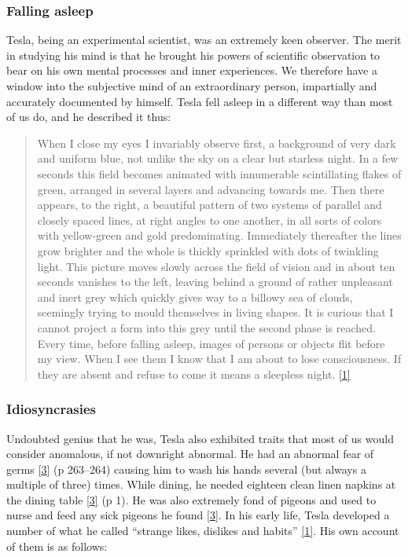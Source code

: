 \documentclass[
  12pt,
  british,
  a4paper,
  rgb,
  dvipsnames,
  svgnames,
  hyphens]{article}
\begin{document}
\hypertarget{falling-asleep}{%
\subsubsection{Falling asleep}\label{falling-asleep}}

Tesla, being an experimental scientist, was an extremely keen observer.
The merit in studying his mind is that he brought his powers of
scientific observation to bear on his own mental processes and inner
experiences. We therefore have a window into the subjective mind of an
extraordinary person, impartially and accurately documented by himself.
Tesla fell asleep in a different way than most of us do, and he
described it thus:

\begin{quote}
When I close my eyes I invariably observe first, a background of very
dark and uniform blue, not unlike the sky on a clear but starless night.
In a few seconds this field becomes animated with innumerable
scintillating flakes of green, arranged in several layers and advancing
towards me. Then there appears, to the right, a beautiful pattern of two
systems of parallel and closely spaced lines, at right angles to one
another, in all sorts of colors with yellow-green and gold
predominating. Immediately thereafter the lines grow brighter and the
whole is thickly sprinkled with dots of twinkling light. This picture
moves slowly across the field of vision and in about ten seconds
vanishes to the left, leaving behind a ground of rather unpleasant and
inert grey which quickly gives way to a billowy sea of clouds, seemingly
trying to mould themselves in living shapes. It is curious that I cannot
project a form into this grey until the second phase is reached. Every
time, before falling asleep, images of persons or objects flit before my
view. When I see them I know that I am about to lose consciousness. If
they are absent and refuse to come it means a sleepless night.
\protect\hyperlink{ref-john83}{{[}1{]}}
\end{quote}

\hypertarget{idiosyncrasies}{%
\subsubsection{Idiosyncrasies}\label{idiosyncrasies}}

Undoubted genius that he was, Tesla also exhibited traits that most of
us would consider anomalous, if not downright abnormal. He had an
abnormal fear of germs \protect\hyperlink{ref-cheney81}{{[}3{]}} (p
263--264) causing him to wash his hands several (but always a multiple
of three) times. While dining, he needed eighteen clean linen napkins at
the dining table \protect\hyperlink{ref-cheney81}{{[}3{]}} (p 1). He was
also extremely fond of pigeons and used to nurse and feed any sick
pigeons he found \protect\hyperlink{ref-cheney81}{{[}3{]}}. In his early
life, Tesla developed a number of what he called ``strange likes,
dislikes and habits'' \protect\hyperlink{ref-john83}{{[}1{]}}. His own
account of them is as follows:
\end{document}
